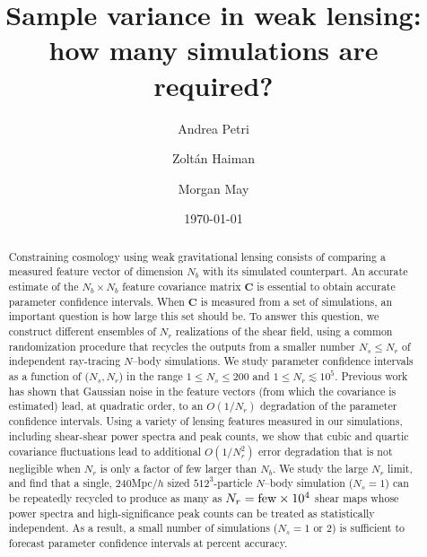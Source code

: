 \documentclass[reprint,aps,prd,superscriptaddress,showkeys,showpacs]{revtex4-1}
\newcommand{\bb}[1]{\mathbf{#1}}
\begin{document}
\title{Sample variance in weak lensing: how many simulations are required?}

\author{Andrea Petri}

\author{Zolt\'an Haiman}

\author{Morgan May}

\date{\today}

\label{firstpage}

\begin{abstract}

Constraining cosmology using weak gravitational lensing consists of
comparing a measured feature vector of dimension $N_b$ with its
simulated counterpart. An accurate estimate of the $N_b\times N_b$
feature covariance matrix $\bb{C}$ is essential to obtain accurate
parameter confidence intervals. When $\bb{C}$ is measured from a set
of simulations, an important question is how large this set should
be. To answer this question, we construct different ensembles of $N_r$
realizations of the shear field, using a common randomization
procedure that recycles the outputs from a smaller number $N_s\leq
N_r$ of independent ray-tracing $N$--body simulations.  We study
parameter confidence intervals as a function of ($N_s,N_r$) in the
range $1\leq N_s\leq 200$ and $1\leq N_r\lesssim 10^5$.  Previous work
\citep{DodelsonSchneider13} has shown that Gaussian noise in the
feature vectors (from which the covariance is estimated) lead, at quadratic order, to an $O(1/N_r)$
degradation of the parameter confidence intervals. Using a variety of
lensing features measured in our simulations, including shear-shear
power spectra and peak counts, we show that cubic and quartic
covariance fluctuations lead to additional $O(1/N_r^2)$ error
degradation that is not negligible when $N_r$ is only a factor of few
larger than $N_b$. We study the large $N_r$ limit, and find that a
single, 240Mpc$/h$ sized $512^3$-particle $N$--body simulation ($N_s=1$) can be repeatedly recycled to
produce as many as $N_r={\rm few}\times10^4$ shear maps whose power spectra and high-significance peak counts can be treated as statistically independent. As a result, a small number of simulations ($N_s=1$ or $2$) is sufficient to forecast parameter confidence intervals at percent accuracy. 

\end{abstract}
\end{document}
